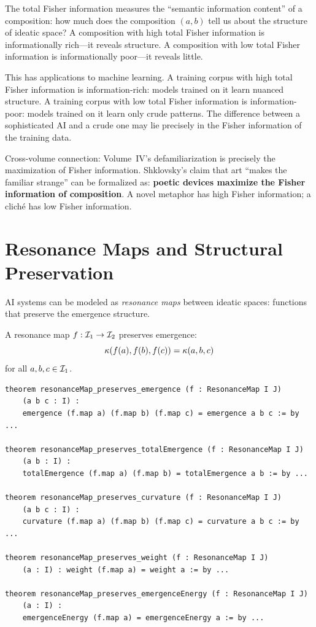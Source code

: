 \begin{interpretation}
The total Fisher information measures the ``semantic information content'' of
a composition: how much does the composition $(a, b)$ tell us about the
structure of ideatic space? A composition with high total Fisher information
is informationally rich---it reveals structure. A composition with low total
Fisher information is informationally poor---it reveals little.

This has applications to machine learning. A training corpus with high total
Fisher information is information-rich: models trained on it learn nuanced
structure. A training corpus with low total Fisher information is
information-poor: models trained on it learn only crude patterns. The
difference between a sophisticated AI and a crude one may lie precisely in
the Fisher information of the training data.

Cross-volume connection: Volume~IV's defamiliarization is precisely the
maximization of Fisher information. Shklovsky's claim that art ``makes the
familiar strange'' can be formalized as: \textbf{poetic devices maximize the
Fisher information of composition}. A novel metaphor has high Fisher
information; a cliché has low Fisher information.
\end{interpretation}


\section{Resonance Maps and Structural Preservation}

AI systems can be modeled as \emph{resonance maps} between ideatic spaces:
functions that preserve the emergence structure.

\begin{theorem}
\label{thm:resonance-maps}
A resonance map $f : \mathcal{I}_1 \to \mathcal{I}_2$ preserves emergence:
\[
  \kappa(f(a), f(b), f(c)) = \kappa(a, b, c)
\]
for all $a, b, c \in \mathcal{I}_1$.
\end{theorem}

\begin{lstlisting}[caption={Resonance maps (IDT\_v3\_Emergence.lean)}]
theorem resonanceMap_preserves_emergence (f : ResonanceMap I J)
    (a b c : I) :
    emergence (f.map a) (f.map b) (f.map c) = emergence a b c := by ...

theorem resonanceMap_preserves_totalEmergence (f : ResonanceMap I J)
    (a b : I) :
    totalEmergence (f.map a) (f.map b) = totalEmergence a b := by ...

theorem resonanceMap_preserves_curvature (f : ResonanceMap I J)
    (a b c : I) :
    curvature (f.map a) (f.map b) (f.map c) = curvature a b c := by ...

theorem resonanceMap_preserves_weight (f : ResonanceMap I J)
    (a : I) : weight (f.map a) = weight a := by ...

theorem resonanceMap_preserves_emergenceEnergy (f : ResonanceMap I J)
    (a : I) :
    emergenceEnergy (f.map a) = emergenceEnergy a := by ...
\end{lstlisting}


